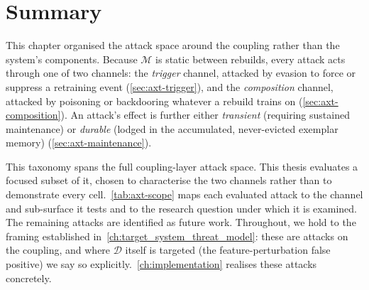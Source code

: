 \section{Summary}
\label{sec:axt-scope}
This chapter organised the attack space around the coupling rather than the system's components. Because $\mathcal{M}$ is static between rebuilds, every attack acts through one of two channels: the \emph{trigger} channel, attacked by evasion to force or suppress a retraining event (\cref{sec:axt-trigger}), and the \emph{composition} channel, attacked by poisoning or backdooring whatever a rebuild trains on (\cref{sec:axt-composition}). An attack's effect is further either \emph{transient} (requiring sustained maintenance) or \emph{durable} (lodged in the accumulated, never-evicted exemplar memory) (\cref{sec:axt-maintenance}).

This taxonomy spans the full coupling-layer attack space. This thesis evaluates a focused subset of it, chosen to characterise the two channels rather than to demonstrate every cell.~\cref{tab:axt-scope} maps each evaluated attack to the channel and sub-surface it tests and to the research question under which it is examined. The remaining attacks are identified as future work. Throughout, we hold to the framing established in~\cref{ch:target_system_threat_model}: these are attacks on the coupling, and where $\mathcal{D}$ itself is targeted (the feature-perturbation false positive) we say so explicitly.~\cref{ch:implementation} realises these attacks concretely.

